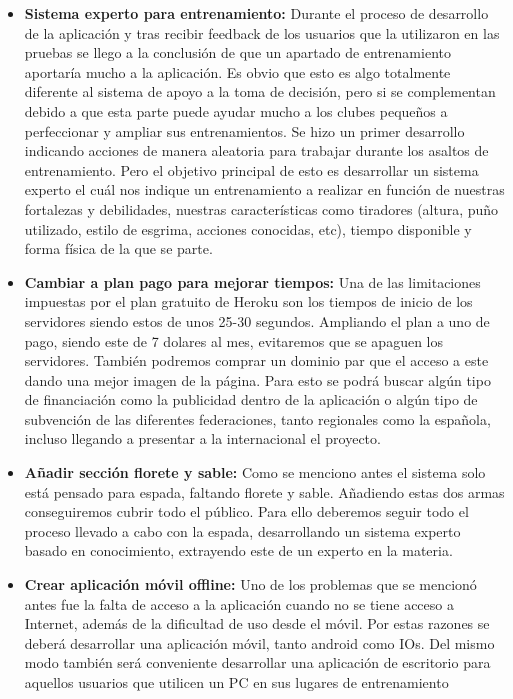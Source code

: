 \begin{itemize}
  \item \textbf{Sistema experto para entrenamiento:} Durante el proceso de desarrollo de
    la aplicación y tras recibir feedback de los usuarios que la utilizaron en las pruebas
    se llego a la conclusión de que un apartado de entrenamiento aportaría mucho a la aplicación.
    Es obvio que esto es algo totalmente diferente al sistema de apoyo a la toma de decisión,
    pero si se complementan debido a que esta parte puede ayudar mucho a los clubes pequeños
    a perfeccionar y ampliar sus entrenamientos. Se hizo un primer desarrollo indicando
    acciones de manera aleatoria para trabajar durante los asaltos de entrenamiento. Pero el
    objetivo principal de esto es desarrollar un sistema experto el cuál nos indique un
    entrenamiento a realizar en función de nuestras fortalezas y debilidades, nuestras
    características como tiradores (altura, puño utilizado, estilo de esgrima,
    acciones conocidas, etc), tiempo disponible y forma física de la que se parte.
  \item \textbf{Cambiar a plan pago para mejorar tiempos:} Una de las limitaciones
    impuestas por el plan gratuito de Heroku son los tiempos de inicio de los servidores
    siendo estos de unos 25-30 segundos. Ampliando el plan a uno de pago, siendo este
    de 7 dolares al mes, evitaremos que se apaguen los servidores. También podremos
    comprar un dominio par que el acceso a este dando una mejor imagen de la página.
    Para esto se podrá buscar algún tipo de financiación como la publicidad dentro
    de la aplicación o algún tipo de subvención de las diferentes federaciones, tanto
    regionales como la española, incluso llegando a presentar a la internacional el
    proyecto.
  \item \textbf{Añadir sección florete y sable:} Como se menciono antes el sistema
    solo está pensado para espada, faltando florete y sable. Añadiendo estas dos
    armas conseguiremos cubrir todo el público. Para ello deberemos seguir
    todo el proceso llevado a cabo con la espada, desarrollando un sistema experto
    basado en conocimiento, extrayendo este de un experto en la materia.
  \item \textbf{Crear aplicación móvil offline:} Uno de los problemas
    que se mencionó antes fue la falta de acceso a la aplicación cuando no se
    tiene acceso a Internet, además de la dificultad de uso desde el móvil.
    Por estas razones se deberá desarrollar una aplicación móvil, tanto android
    como IOs. Del mismo modo también será conveniente desarrollar una aplicación
    de escritorio para aquellos usuarios que utilicen un PC en sus lugares de entrenamiento
\end{itemize}
